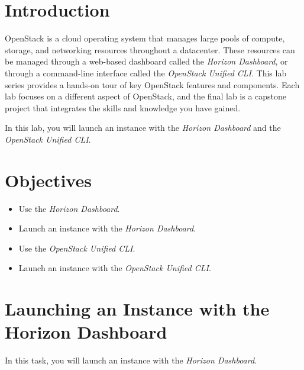 \documentclass[letterpaper, 12pt]{article}
\begin{document}

\section*{Introduction}\label{sec:introduction}
OpenStack is a cloud operating system that manages large pools of compute, storage, and networking resources throughout a datacenter.
These resources can be managed through a web-based dashboard called the \textit{Horizon Dashboard}, or through a command-line interface called the \textit{OpenStack Unified CLI}.
This lab series provides a hands-on tour of key OpenStack features and components.
Each lab focuses on a different aspect of OpenStack, and the final lab is a capstone project that integrates the skills and knowledge you have gained.

In this lab, you will launch an instance with the \textit{Horizon Dashboard} and the \textit{OpenStack Unified CLI}.

\section*{Objectives}\label{sec:objectives}
\begin{itemize}[itemsep=0pt]
    \item Use the \textit{Horizon Dashboard}.
    \item Launch an instance with the \textit{Horizon Dashboard}.
    \item Use the \textit{OpenStack Unified CLI}.
    \item Launch an instance with the \textit{OpenStack Unified CLI}.
\end{itemize}
\clearpage

\labsettings

\section{Launching an Instance with the Horizon Dashboard}\label{launching-an-instance-with-the-horizon-dashboard}
In this task, you will launch an instance with the \textit{Horizon Dashboard}.
\end{document}

